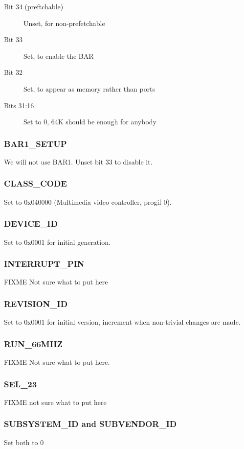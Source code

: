 \documentclass[12pt]{article}
\begin{document}
\begin{description}
\item[Bit 34 (preftchable)] Unset, for non-prefetchable
\item[Bit 33] Set, to enable the BAR
\item[Bit 32] Set, to appear as memory rather than ports
\item[Bits 31:16] Set to 0, 64K should be enough for anybody
\end{description}

\subsubsection{BAR1\_SETUP}
We will not use BAR1. Unset bit 33 to disable it.

\subsubsection{CLASS\_CODE}
Set to 0x040000 (Multimedia video controller, progif 0).

\subsubsection{DEVICE\_ID}
Set to 0x0001 for initial generation.

\subsubsection{INTERRUPT\_PIN}
FIXME Not sure what to put here

\subsubsection{REVISION\_ID}
Set to 0x0001 for initial version, increment when non-trivial changes are made.

\subsubsection{RUN\_66MHZ}
FIXME Not sure what to put here.

\subsubsection{SEL\_23}
FIXME not sure what to put here

\subsubsection{SUBSYSTEM\_ID and SUBVENDOR\_ID}
Set both to 0
\end{document}
